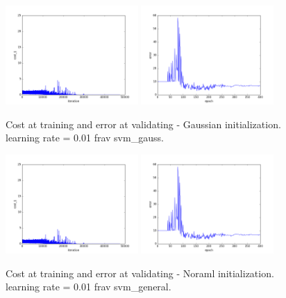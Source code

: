 \begin{figure}[htb]
\centering
\includegraphics[width=0.45\textwidth]{images/FRAv_casia_ImageNet/Imagenet2/frav/svm_gauss/cost.png}
\includegraphics[width=0.45\textwidth]{images/FRAv_casia_ImageNet/Imagenet2/frav/svm_gauss/error.png}
\caption{Cost at training and error at validating - Gaussian initialization. learning rate = 0.01 frav svm\_gauss.} \label{fig:Imagenet2-frav-svm_gauss}
\end{figure}

\begin{figure}[htb]
\centering
\includegraphics[width=0.45\textwidth]{images/FRAv_casia_ImageNet/Imagenet2/frav/svm_general/cost.png}
\includegraphics[width=0.45\textwidth]{images/FRAv_casia_ImageNet/Imagenet2/frav/svm_general/error.png}
\caption{Cost at training and error at validating - Noraml initialization. learning rate = 0.01 frav svm\_general.} \label{fig:Imagenet2-frav-svm_general}
\end{figure}


